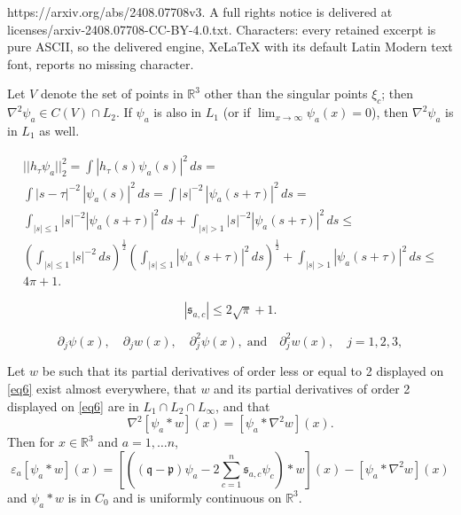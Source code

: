 \documentclass[10pt,a4paper]{amsart}
\newcommand{\IR}{\text{${\mathbb{R}}$}}
\newcommand{\del}{\mbox{$\partial$}}
\newcommand{\half}{\mbox{$\frac{1}{2}$}}
\newcommand{\p}{\mathfrak{p}}
\newcommand{\q}{\mathfrak{q}}
\newcommand{\s}{\mathfrak{s}}
\begin{document}
https://arxiv.org/abs/2408.07708v3. A full rights notice is delivered at licenses/arxiv-2408.07708-CC-BY-4.0.txt. Characters: every retained excerpt is pure ASCII, so the delivered engine, XeLaTeX with its default Latin Modern text font, reports no missing character.
\begin{thm} \label{thm1} Let $V$ denote the set of points in $\IR^3$ other than the singular points $\xi_c$; then 
$\nabla^2\psi_a \in C(V) \cap L_2$. If $\psi_a$ is also in $L_1$ (or if $\lim_{x\rightarrow \infty}\psi_a(x)=0$), then $\nabla^2\psi_a $ is in $L_1$ as well.
\end{thm}

\begin{multline} \label{eq4}
||h_{\tau}\psi_a||^2_2=\int |h_{\tau}(s)\psi_a(s)|^2 \,ds= \\
\int |s-\tau|^{-2}\,|\psi_a(s)|^2 \,ds=\int |s|^{-2}\, |\psi_a(s+\tau)|^2 \,ds =\\
\int _{|s|\le1}|s|^{-2}|\psi_a(s+\tau)|^2 \,ds + \int_{|s| >1} |s|^{-2}|\psi_a(s+\tau)|^2 \,ds\le\\
\left (\int _{|s|\le1}|s|^{-2}\,ds \right)^{\half} \left (\int _{|s|\le1}|\psi_a(s+\tau)|^2 \,ds \right )^{\half} +\int_{|s| >1}|\psi_a(s+\tau)|^2 \,ds \le \\
4\pi+1.
\end{multline}

\begin{equation} \label{eq5}
|\s_{a,c}| \le 2\sqrt{\pi}+1.
\end{equation}

\begin{equation} \label{eq6}
\del_j\psi(x), \quad \del_jw(x), \quad \del^2_j\psi(x),\; \text{and}\quad\del^2_j w(x), \quad j=1, 2, 3,
\end{equation}

\begin{thm} \label{thm3}
Let $w$ be such that its partial derivatives of order less or equal to 2 displayed on \eqref{eq6} exist almost everywhere, that $w$ and its partial derivatives of order 2  displayed on \eqref{eq6} are in $ L_1\cap L_2 \cap L_{\infty}$,  and that
\[
\nabla^2[\psi_a \ast w](x)= [\psi_a\ast \nabla^2w](x).
\]
Then for $x \in \IR^3$ and $a=1, \dots n$,
\begin{equation} \label{eq10}
 \varepsilon_a [\psi_a \ast w](x)=
\left [\left ( (\q - \p) \psi _a-2\sum_{c=1}^n \s_{a,c}\psi_{c}\right )\ast w\right ](x) -[\psi_{a}\ast \nabla^2w](x)
\end{equation}
and $\psi _a\ast w$ is in $C_0$  and is uniformly continuous on $\IR^3$.
\end{thm}
\end{document}
